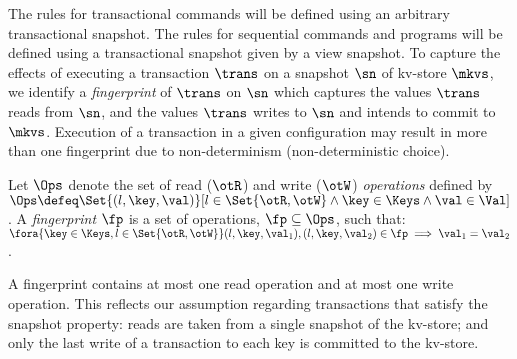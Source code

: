 The rules for transactional commands will be defined  using an arbitrary 
transactional snapshot. The rules for sequential
commands and programs will be defined  using a transactional
snapshot given by a view snapshot. 
To capture the effects of executing a transaction $\trans$ on a snapshot $\sn$ of kv-store $\mkvs$, 
we identify a \emph{fingerprint}  of $\trans$ on $\sn$ which captures
 the values $\trans$ reads from $\sn$, and
the values $\trans$ writes to $\sn$ and intends to commit to $\mkvs$. 
Execution of a transaction in a given configuration may result in more than one fingerprint due to non-determinism (non-deterministic choice). 

\begin{definition}[Fingerprints]
\label{beebop}
\label{def:fingerprint}
Let \( \Ops\) denote the set of read (\( \otR\)) and write (\(\otW\)) \emph{operations} defined by 
$\Ops \defeq \Set{(l, \key, \val) }[ l \in \Set{\otR, \otW} \land \key \in \Keys \land \val \in \Val ]$.
A \emph{fingerprint} $\fp$ is a set of operations, $\fp \subseteq \Ops$,
such that: 
$\fora{\key \in \Keys, l  \in \Set{\otR, \otW}}
	(l, \key, \val_1), (l, \key, \val_2) \in \fp \implies \val_1 = \val_2$.
\end{definition}
\noindent 
A fingerprint contains at most one read operation and at most one write operation. 
This reflects our assumption regarding transactions that satisfy the snapshot property: reads are taken from a single snapshot of the kv-store;
and 
only the last write of a transaction to each key is committed to the kv-store.
